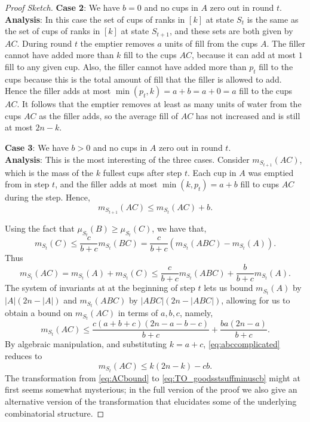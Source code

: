 \begin{proof}[Proof Sketch]
\noindent\textbf{Case 2}:
We have $b = 0$ and no cups in $A$ zero out in round $t$.\\
\textbf{Analysis}: In this case the set of cups of ranks in $[k]$ at
state $S_t$ is the same as the set of cups of ranks in $[k]$ at state
$S_{t+1}$, and these sets are both given by $AC$. During round $t$ the
emptier removes $a$ units of fill from the cups $A$. The filler cannot
have added more than $k$ fill to the cups $AC$, because it can add at
most $1$ fill to any given cup. Also, the filler cannot have added
more than $p_t$ fill to the cups because this is the total amount of
fill that the filler is allowed to add. Hence the filler adds at most
$\min(p_t, k) = a+b=a+0=a$ fill to the cups $AC$. It follows that the
emptier removes at least as many units of water from the cups $AC$ as
the filler adds, so the average fill of $AC$ has not increased and is
still at most $2n-k$.

\vspace{.3 cm}

\noindent\textbf{Case 3}:
We have $b > 0$ and no cups in $A$ zero out in round $t$. \\
\textbf{Analysis}:
This is the most interesting of the three cases. Consider
$m_{S_{t+1}}(AC)$, which is the mass of the $k$ fullest
cups after step $t$. Each cup in $A$ was emptied from in step $t$, and the
filler adds at most $\min(k, p_t) = a+b$ fill to cups $AC$ during the step. 
Hence, 
\begin{equation}
  \label{eq:TO_bplusmAC}
m_{S_{t+1}}(AC) \le m_{S_t}(AC) + b.
\end{equation}

Using the fact that $\mu_{S_t}(B) \ge \mu_{S_t}(C)$, we have that, 
$$m_{S_t}(C) \le \frac{c}{b+c} m_{S_t}(BC) = \frac{c}{b+c}(m_{S_t}(ABC) - m_{S_t}(A)).$$
Thus
\begin{equation}
  m_{S_{t}}(AC) = m_{S_t}(A) + m_{S_t}(C) \le \frac{c}{b+c}m_{S_t}(ABC) + \frac{b}{b+c}m_{S_t}(A).
  \label{eq:ACbound}
\end{equation} 
The system of invariants at at the beginning of step $t$ lets us
bound $m_{S_t}(A)$ by $|A|(2n - |A|)$ and $m_{S_t}(ABC)$ by
$|ABC|(2n - |ABC|)$, allowing for us to obtain a bound on
$m_{S_{t}}(AC)$ in terms of $a, b, c$, namely, 
\begin{equation}
  m_{S_{t}}(AC) \le \frac{c(a+b+c) (2n - a-b-c)}{b+c} + \frac{b
  a(2n-a)}{b+c}.
  \label{eq:abccomplicated}
\end{equation}
By algebraic manipulation, and substituting $k=a+c$, \eqref{eq:abccomplicated} reduces to
\begin{equation}
  \label{eq:TO_goodsstsuffminuscb}
  m_{S_t}(AC) \le  k(2n-k)-cb.
\end{equation}
The transformation from \eqref{eq:ACbound} to
\eqref{eq:TO_goodsstsuffminuscb} might at first seems somewhat
mysterious; in the full version of the proof we also give an
alternative version of the transformation that elucidates some of
the underlying combinatorial structure.


\end{proof}
